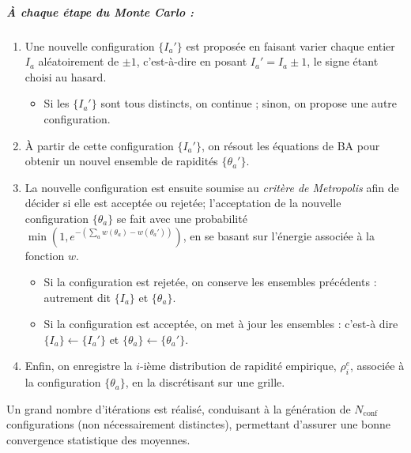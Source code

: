 \subparagraph{À chaque étape du \emph{Monte Carlo} :}
\begin{enumerate}%
    \item Une nouvelle configuration \( \{I_a'\} \) est proposée en faisant varier chaque entier \( I_a \) aléatoirement de \(\pm 1\), c’est-à-dire en posant
		\( I_a' = I_a \pm 1 \), le signe étant choisi au hasard.
    	\begin{itemize}[label = $\bullet$]
        	\item Si les \( \{I_a'\} \) sont tous distincts, on continue ; sinon, on propose une autre configuration.
    	\end{itemize}

    \item À partir de cette configuration \( \{I_a'\} \), on résout les équations de \gls{BA} pour obtenir un nouvel ensemble de rapidités \( \{ \theta_a' \} \).

	\item La nouvelle configuration est ensuite soumise au {\em critère de Metropolis} afin de décider si elle est acceptée ou rejetée; l’acceptation de la nouvelle configuration $\{\theta_a\}$ se fait avec une probabilité \( \min\left(1 , e^{- \left(\sum_a w(\theta_a) -  w(\theta_a')\right)}\right) \), en se basant sur l’énergie associée à la fonction \( w \).
	\begin{itemize}[label = $\bullet$]
		\item Si la configuration est rejetée, on conserve les ensembles précédents : autrement dit \( \{I_a\} \) et \( \{\theta_a\} \).
    	\item Si la configuration est acceptée, on met à jour les ensembles : c'est-à dire \( \{I_a\} \leftarrow \{I_a'\} \) et \( \{\theta_a\} \leftarrow \{\theta_a'\} \).
	\end{itemize}

	\item Enfin, on enregistre la \(i\)-ième distribution de rapidité empirique, \(\rho^e_i\),  associée à la configuration \(\{\theta_a\}\), en la discrétisant sur une grille.

\end{enumerate}

\medskip

Un grand nombre d’itérations est réalisé, conduisant à la génération de \( N_{\text{conf}} \) configurations (non nécessairement distinctes), permettant d’assurer une bonne convergence statistique des moyennes.

